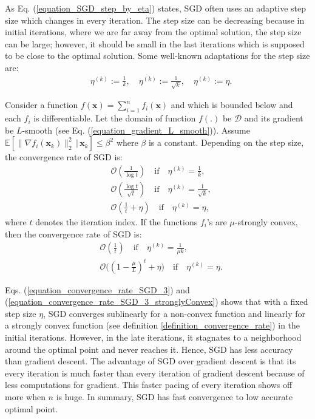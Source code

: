 \documentclass[lang=cn,10pt]{gorgeousnbook}
\numberwithin{equation}{section}%
\numberwithin{figure}{section}%
\begin{document}
As Eq. (\ref{equation_SGD_step_by_eta}) states, SGD often uses an adaptive step size which changes in every iteration. The step size can be decreasing because in initial iterations, where we are far away from the optimal solution, the step size can be large; however, it should be small in the last iterations which is supposed to be close to the optimal solution. Some well-known adaptations for the step size are:
\begin{align}
& \eta^{(k)} := \frac{1}{k}, \quad \eta^{(k)} := \frac{1}{\sqrt{k}}, \quad \eta^{(k)} := \eta. 
\end{align}

\begin{theorem}
Consider a function $f(\boldsymbol{x}) = \sum_{i=1}^n f_i(\boldsymbol{x})$ and which is bounded below and each $f_i$ is differentiable. Let the domain of function $f(.)$ be $\mathcal{D}$ and its gradient be $L$-smooth (see Eq. (\ref{equation_gradient_L_smooth})). Assume $\mathbb{E}[\|\nabla f_i(\boldsymbol{x}_k)\|_2^2\,|\,\boldsymbol{x}_k] \leq \beta^2$ where $\beta$ is a constant. Depending on the step size, the convergence rate of SGD is:
\begin{align}
& \mathcal{O}(\frac{1}{\log t}) \quad \text{if} \quad \eta^{(k)} = \frac{1}{k}, \\
& \mathcal{O}(\frac{\log t}{\sqrt{t}}) \quad \text{if} \quad \eta^{(k)} = \frac{1}{\sqrt{k}}, \\
& \mathcal{O}(\frac{1}{t} + \eta) \quad \text{if} \quad \eta^{(k)} = \eta, \label{equation_convergence_rate_SGD_3}
\end{align}
where $t$ denotes the iteration index. 
If the functions $f_i$'s are $\mu$-strongly convex, then the convergence rate of SGD is:
\begin{align}
& \mathcal{O}(\frac{1}{t}) \quad \text{if} \quad \eta^{(k)} = \frac{1}{\mu k}, \\
& \mathcal{O}\big((1 - \frac{\mu}{L})^t + \eta\big) \quad \text{if} \quad \eta^{(k)} = \eta. \label{equation_convergence_rate_SGD_3_stronglyConvex}
\end{align}
\end{theorem}

Eqs. (\ref{equation_convergence_rate_SGD_3}) and (\ref{equation_convergence_rate_SGD_3_stronglyConvex}) shows that with a fixed step size $\eta$, SGD converges sublinearly for a non-convex function and linearly for a strongly convex function (see definition \ref{definition_convergence_rate}) in the initial iterations. However, in the late iterations, it stagnates to a neighborhood around the optimal point and never reaches it. Hence, SGD has less accuracy than gradient descent. 
The advantage of SGD over gradient descent is that its every iteration is much faster than every iteration of gradient descent because of less computations for gradient. This faster pacing of every iteration shows off more when $n$ is huge. In summary, SGD has fast convergence to low accurate optimal point. 
\end{document}
